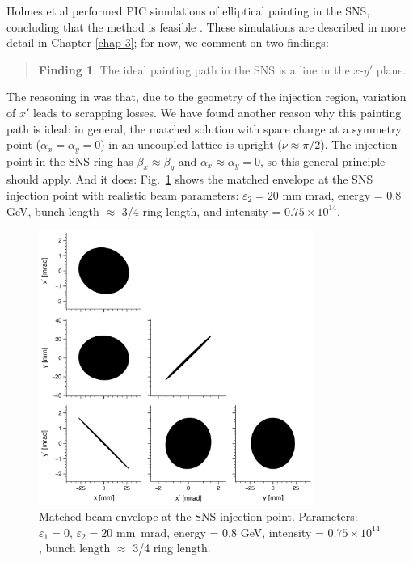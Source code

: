 Holmes et al performed PIC simulations of elliptical painting in the SNS, concluding that the method is feasible \cite{Holmes2018}. These simulations are described in more detail in Chapter \ref{chap-3}; for now, we comment on two findings:
%
\begin{quote}
    \textbf{Finding 1}: The ideal painting path in the SNS is a line in the $x$-$y'$ plane.
\end{quote}
%
The reasoning in \cite{Holmes2018} was that, due to the geometry of the injection region, variation of $x'$ leads to scrapping losses. We have found another reason why this painting path is ideal: in general, the matched solution with space charge at a symmetry point ($\alpha_x = \alpha_y = 0$) in an uncoupled lattice is upright ($\nu \approx \pi/2$). The injection point in the SNS ring has $\beta_x \approx \beta_y$ and $\alpha_x \approx \alpha_y = 0$, so this general principle should apply. And it does: Fig.~\ref{fig:matched_env_SNS} shows the matched envelope at the SNS injection point with realistic beam parameters: $\varepsilon_2 = 20$ mm mrad, energy = 0.8 GeV, bunch length $\approx$ 3/4 ring length, and intensity = $0.75 \times 10^{14}$.
%
\begin{figure}[!p]
    \centering
    \includegraphics[width=0.8\textwidth]{Images/chapter2/matched_env_SNS.png}
    \caption{Matched beam envelope at the SNS injection point. Parameters: $\varepsilon_1 = 0$, $\varepsilon_2 = 20$ mm~mrad, energy = 0.8 GeV, intensity = $0.75 \times 10^{14}$, bunch length $\approx$ 3/4 ring length.}
    \label{fig:matched_env_SNS}
\end{figure}
